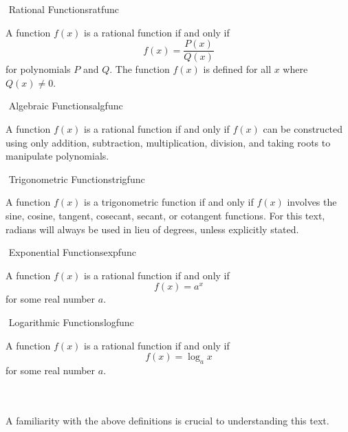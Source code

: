		\begin{definition}{\Stop\,\,Rational Functions}{ratfunc}

			A function \(f(x)\) is a rational function if and only if 
			\begin{equation*}
				f(x)=\frac{P(x)}{Q(x)}
			\end{equation*}
			for polynomials \(P\) and \(Q\). The function \(f(x)\) is defined for all \(x\) where \(Q(x)\neq0\).
			
		\end{definition}
		\begin{definition}{\Stop\,\,Algebraic Functions}{algfunc}

			A function \(f(x)\) is a rational function if and only if \(f(x)\) can be constructed using only addition, subtraction, multiplication, division, and taking roots to manipulate polynomials.
			
		\end{definition}
		\begin{definition}{\Stop\,\,Trigonometric Functions}{trigfunc}

			A function \(f(x)\) is a trigonometric function if and only if \(f(x)\) involves the sine, cosine, tangent, cosecant, secant, or cotangent functions. For this text, radians will always be used in lieu of degrees, unless explicitly stated. 
			
		\end{definition}
		\begin{definition}{\Stop\,\,Exponential Functions}{expfunc}

			A function \(f(x)\) is a rational function if and only if
			\begin{equation*}
				f(x)=a^x
			\end{equation*}
			for some real number \(a\).
			
		\end{definition}
		\begin{definition}{\Stop\,\,Logarithmic Functions}{logfunc}

			A function \(f(x)\) is a rational function if and only if
			\begin{equation*}
				f(x)=\log_ax
			\end{equation*}
			for some real number \(a\).
			
		\end{definition}
		\vphantom
		\\
		\\
		A familiarity with the above definitions is crucial to understanding this text.
	
